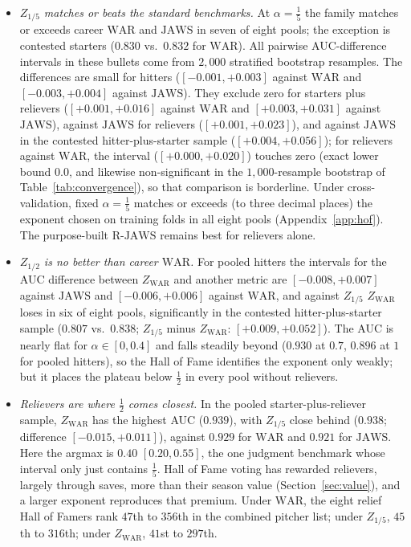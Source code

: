 \documentclass[11pt,letterpaper]{article}
\theoremstyle{plain}
\theoremstyle{definition}
\theoremstyle{remark}
\newcommand{\WAR}{\mathrm{WAR}}
\newcommand{\JAWS}{\mathrm{JAWS}}
\newcommand{\RJAWS}{\mathrm{R\text{-}JAWS}}
\newcommand{\ZWAR}{Z_{\WAR}}
\begin{document}
\begin{itemize}
    \item \emph{$Z_{1/5}$ matches or beats the standard benchmarks.} At $\alpha = \tfrac15$ the family matches or exceeds career $\WAR$ and $\JAWS$ in seven of eight pools; the exception is contested starters ($0.830$ vs.\ $0.832$ for $\WAR$). All pairwise AUC-difference intervals in these bullets come from $2{,}000$ stratified bootstrap resamples. The differences are small for hitters ($[-0.001, +0.003]$ against $\WAR$ and $[-0.003, +0.004]$ against $\JAWS$). They exclude zero for starters plus relievers ($[+0.001, +0.016]$ against $\WAR$ and $[+0.003, +0.031]$ against $\JAWS$), against $\JAWS$ for relievers ($[+0.001, +0.023]$), and against $\JAWS$ in the contested hitter-plus-starter sample ($[+0.004, +0.056]$); for relievers against $\WAR$, the interval ($[+0.000, +0.020]$) touches zero (exact lower bound $0.0$, and likewise non-significant in the $1{,}000$-resample bootstrap of Table~\ref{tab:convergence}), so that comparison is borderline. Under cross-validation, fixed $\alpha = \tfrac15$ matches or exceeds (to three decimal places) the exponent chosen on training folds in all eight pools (Appendix~\ref{app:hof}). The purpose-built $\RJAWS$ remains best for relievers alone.
    \item \emph{$Z_{1/2}$ is no better than career $\WAR$.} For pooled hitters the intervals for the AUC difference between $\ZWAR$ and another metric are $[-0.008, +0.007]$ against $\JAWS$ and $[-0.006, +0.006]$ against $\WAR$, and against $Z_{1/5}$ $\ZWAR$ loses in six of eight pools, significantly in the contested hitter-plus-starter sample ($0.807$ vs.\ $0.838$; $Z_{1/5}$ minus $\ZWAR$: $[+0.009, +0.052]$). The AUC is nearly flat for $\alpha \in [0, 0.4]$ and falls steadily beyond ($0.930$ at $0.7$, $0.896$ at $1$ for pooled hitters), so the Hall of Fame identifies the exponent only weakly; but it places the plateau below $\tfrac12$ in every pool without relievers.
    \item \emph{Relievers are where $\tfrac12$ comes closest.} In the pooled starter-plus-reliever sample, $\ZWAR$ has the highest AUC ($0.939$), with $Z_{1/5}$ close behind ($0.938$; difference $[-0.015, +0.011]$), against $0.929$ for $\WAR$ and $0.921$ for $\JAWS$. Here the argmax is $0.40$ $[0.20, 0.55]$, the one judgment benchmark whose interval only just contains $\tfrac15$. Hall of Fame voting has rewarded relievers, largely through saves, more than their season value (Section~\ref{sec:value}), and a larger exponent reproduces that premium. Under $\WAR$, the eight relief Hall of Famers rank $47$th to $356$th in the combined pitcher list; under $Z_{1/5}$, $45$th to $316$th; under $\ZWAR$, $41$st to $297$th.

\end{itemize}
\end{document}
